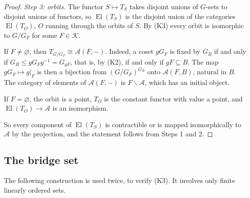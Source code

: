 \documentclass[11pt,a4paper]{article}
\theoremstyle{definition}
\newcommand{\El}{\operatorname{El}}
\newcommand{\K}{\mathcal{K}}
\begin{document}
\begin{proof}
\emph{Step 3: orbits.} The functor $S\mapsto T_S$ takes disjoint unions of
$G$-sets to disjoint unions of functors, so $\El(T_S)$ is the disjoint union of
the categories $\El(T_O)$, $O$ running through the orbits of $S$. By (K3)
every orbit is isomorphic to $G/G_F$ for some $F\in\K$.

If $F\ne\varnothing$, then $T_{G/G_F}\cong\mathcal A(F,-)$. Indeed, a coset
$gG_F$ is fixed by $G_B$ if and only if $G_B\le gG_Fg^{-1}=G_{gF}$, that is, by
(K2), if and only if $gF\subseteq B$. The map $gG_F\mapsto g|_F$ is then a
bijection from $(G/G_F)^{G_B}$ onto $\mathcal A(F,B)$, natural in $B$. The
category of elements of $\mathcal A(F,-)$ is $F\backslash\mathcal A$, which has
an initial object.

If $F=\varnothing$, the orbit is a point, $T_O$ is the constant functor with
value a point, and $\El(T_O)\to\mathcal A$ is an isomorphism.

So every component of $\El(T_S)$ is contractible or is mapped isomorphically
to $\mathcal A$ by the projection, and the statement follows from Steps 1
and 2.
\end{proof}

\subsection{The bridge set}

The following construction is used twice, to verify \textup{(K3)}. It involves
only finite linearly ordered sets.
\end{document}
